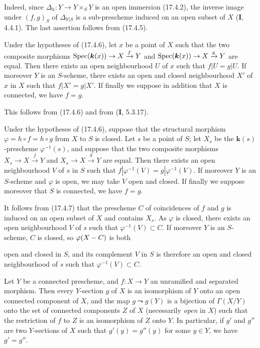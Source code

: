 Indeed, since $\Delta_h:Y\to Y\times_S Y$ is an open immersion (17.4.2), the inverse image under $(f,g)_S$ of $\Delta_{Y|S}$ is a sub-prescheme induced on an open subset of $X$ (\textbf{I}, 4.4.1). The last assertion follows from (17.4.5).

\begin{corollary}[17.4.7]
\label{IV.17.4.7}
Under the hypotheses of \textup{(17.4.6)}, let $x$ be a point of $X$ such that the two composite morphisms $\operatorname{Spec}(\boldsymbol{k}(x))\to X\xrightarrow{f}Y$ and $\operatorname{Spec}(\boldsymbol{k}(x))\to X\xrightarrow{g}Y$ are equal. Then there exists an open neighbourhood $U$ of $x$ such that $f|U=g|U$. If moreover $Y$ is an $S$-scheme, there exists an open and closed neighbourhood $X'$ of $x$ in $X$ such that $f|X'=g|X'$. If finally we suppose in addition that $X$ is connected, we have $f=g$.
\end{corollary}

This follows from (17.4.6) and from (\textbf{I}, 5.3.17).

\begin{corollary}[17.4.8]
\label{IV.17.4.8}
Under the hypotheses of \textup{(17.4.6)}, suppose that the structural morphism $\varphi=h\circ f=h\circ g$ from $X$ to $S$ is closed. Let $s$ be a point of $S$; let $X_s$ be the $\boldsymbol{k}(s)$-prescheme $\varphi^{-1}(s)$, and suppose that the two composite morphisms $X_s\to X\xrightarrow{f}Y$ and $X_s\to X\xrightarrow{g}Y$ are equal. Then there exists an open neighbourhood $V$ of $s$ in $S$ such that $f|\varphi^{-1}(V)=g|\varphi^{-1}(V)$. If moreover $Y$ is an $S$-scheme and $\varphi$ is open, we may take $V$ open and closed. If finally we suppose moreover that $S$ is connected, we have $f=g$.
\end{corollary}

It follows from (17.4.7) that the prescheme $C$ of coincidences of $f$ and $g$ is induced on an open subset of $X$ and contains $X_s$. As $\varphi$ is closed, there exists an open neighbourhood $V$ of $s$ such that $\varphi^{-1}(V)\subset C$. If moreover $Y$ is an $S$-scheme, $C$ is closed, so $\varphi(X- C)$ is both

open and closed in $S$, and its complement $V$ in $S$ is therefore an open and closed neighbourhood of $s$ such that $\varphi^{-1}(V)\subset C$.

\begin{proposition}[17.4.9]
\label{IV.17.4.9}
Let $Y$ be a connected prescheme, and $f:X\to Y$ an unramified and separated morphism. Then every $Y$-section $g$ of $X$ is an isomorphism of $Y$ onto an open connected component of $X$, and the map $g\leadsto g(Y)$ is a bijection of $\Gamma(X/Y)$ onto the set of connected components $Z$ of $X$ \textup{(necessarily \emph{open} in $X$)} such that the restriction of $f$ to $Z$ is an isomorphism of $Z$ onto $Y$. In particular, if $g'$ and $g''$ are two $Y$-sections of $X$ such that $g'(y)=g''(y)$ for some $y\in Y$, we have $g'=g''$.
\end{proposition}

